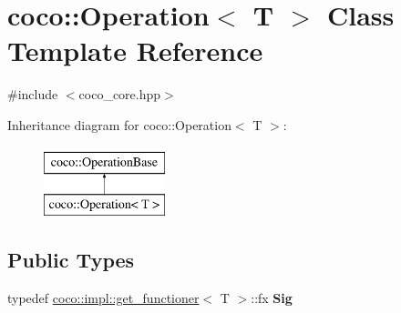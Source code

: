 \hypertarget{classcoco_1_1_operation}{}\section{coco\+:\+:Operation$<$ T $>$ Class Template Reference}
\label{classcoco_1_1_operation}


{\ttfamily \#include $<$coco\+\_\+core.\+hpp$>$}

Inheritance diagram for coco\+:\+:Operation$<$ T $>$\+:\begin{figure}[H]
\begin{center}
\leavevmode
\includegraphics[height=2.000000cm]{classcoco_1_1_operation}
\end{center}
\end{figure}
\subsection*{Public Types}
\begin{DoxyCompactItemize}
\item 
\hypertarget{classcoco_1_1_operation_a0ca4f6e3d30de1c5121d5b55f7abb5ac}{}typedef \hyperlink{structcoco_1_1impl_1_1get__functioner}{coco\+::impl\+::get\+\_\+functioner}$<$ T $>$\+::fx {\bfseries Sig}\label{classcoco_1_1_operation_a0ca4f6e3d30de1c5121d5b55f7abb5ac}

\end{DoxyCompactItemize}
